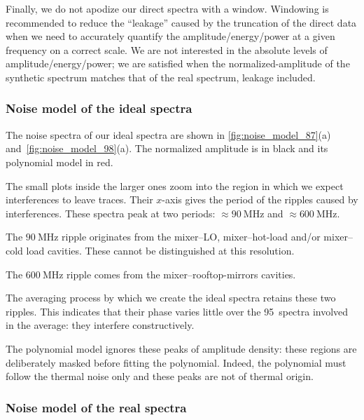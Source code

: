 Finally, we do not apodize our direct spectra with a window.
Windowing is recommended to reduce the ``leakage'' caused by the truncation of the direct data when we need to accurately quantify the amplitude/energy/power at a given frequency on a correct scale.
We are not interested in the absolute levels of amplitude/energy/power;
we are satisfied when the normalized-amplitude of the synthetic spectrum matches that of the real spectrum, leakage included.

\subsubsection{Noise model of the ideal spectra}

The noise spectra of our ideal spectra are shown in \cref{fig:noise_model_87}(a)
and~\cref{fig:noise_model_98}(a).
The normalized amplitude is in black and its polynomial model in red.

The small plots inside the larger ones zoom into the region in which we expect interferences to leave traces.
Their $x$-axis gives the period of the ripples caused by interferences.
These spectra peak at two periods:
$\approx\SI{90}{\mega\hertz}$ and $\approx\SI{600}{\mega\hertz}$.

The $\SI{90}{\mega\hertz}$ ripple originates from the mixer--LO, mixer--hot-load and/or mixer--cold load cavities.
These cannot be distinguished at this resolution.

The $\SI{600}{\mega\hertz}$ ripple comes from the mixer--rooftop-mirrors cavities.

The averaging process by which we create the ideal spectra retains these two ripples.
This indicates that their phase varies little over the 95~spectra involved in the average:
they interfere constructively.

The polynomial model ignores these peaks of amplitude density: these regions are deliberately masked before fitting the polynomial.
Indeed, the polynomial must follow the thermal noise only and these peaks are not of thermal origin.

\subsubsection{Noise model of the real spectra}
\label{sec:noise_model_of_the_real_spectra}

